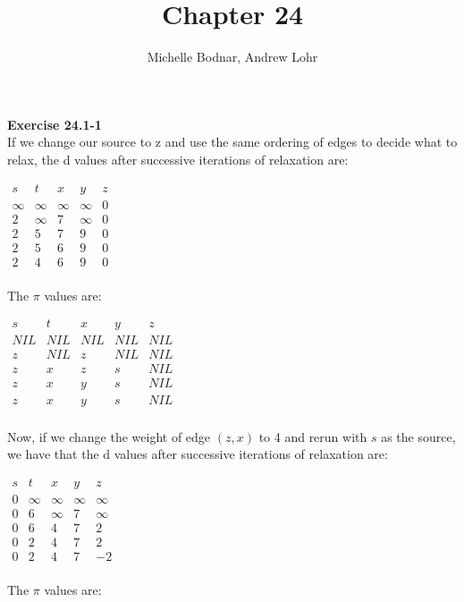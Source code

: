 \documentclass{article}
\title{Chapter 24}
\author{Michelle Bodnar, Andrew Lohr}
\begin{document}
\maketitle
\noindent\textbf{Exercise 24.1-1}\\

If we change our source to z and use the same ordering of edges to decide what to relax, the d values after successive iterations of relaxation are:

\begin{center}
$
\begin{array}{|c|c|c|c|c|}
s&t&x&y&z\\
\hline
\infty&\infty&\infty&\infty&0\\
2&\infty&7&\infty&0\\
2&5&7&9&0\\
2&5&6&9&0\\
2&4&6&9&0\\
\end{array}
$
\end{center}

The $\pi$ values are:

\begin{center}
$
\begin{array}{|c|c|c|c|c|}
s&t&x&y&z\\
\hline
NIL&NIL&NIL&NIL&NIL\\
z&NIL&z&NIL&NIL\\
z&x&z&s&NIL\\
z&x&y&s&NIL\\
z&x&y&s&NIL\\
\end{array}
$
\end{center}


Now, if we change the weight of edge $(z,x)$ to 4 and rerun with $s$ as the source, we have that the d values after successive iterations of relaxation are:

\begin{center}
$
\begin{array}{|c|c|c|c|c|}
s&t&x&y&z\\
\hline
0&\infty&\infty&\infty&\infty\\
0&6&\infty&7&\infty\\
0&6&4&7&2\\
0&2&4&7&2\\
0&2&4&7&-2\\
\end{array}
$
\end{center}


The $\pi$ values are:
\end{document}
